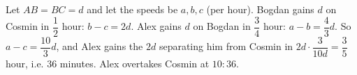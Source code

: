Let $AB=BC=d$ and let the speeds be $a,b,c$ (per hour). Bogdan gains $d$ on Cosmin in $\dfrac12$ hour: $b-c=2d$. Alex gains $d$ on Bogdan in $\dfrac34$ hour: $a-b=\dfrac43d$. So $a-c=\dfrac{10}3d$, and Alex gains the $2d$ separating him from Cosmin in $2d\cdot\dfrac{3}{10d}=\dfrac35$ hour, i.e. $36$ minutes. Alex overtakes Cosmin at $\boxed{10\!:\!36}$.
